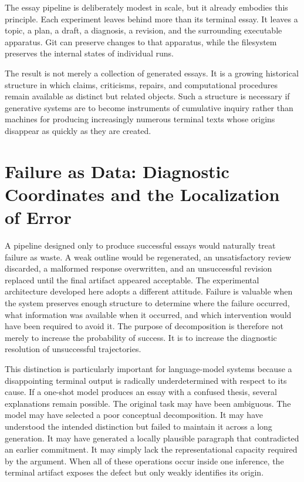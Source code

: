 \documentclass[11pt]{article}
\begin{document}
The essay pipeline is deliberately modest in scale, but it already embodies this principle. Each experiment leaves behind more than its terminal essay. It leaves a topic, a plan, a draft, a diagnosis, a revision, and the surrounding executable apparatus. Git can preserve changes to that apparatus, while the filesystem preserves the internal states of individual runs.

The result is not merely a collection of generated essays. It is a growing historical structure in which claims, criticisms, repairs, and computational procedures remain available as distinct but related objects. Such a structure is necessary if generative systems are to become instruments of cumulative inquiry rather than machines for producing increasingly numerous terminal texts whose origins disappear as quickly as they are created.

\section{Failure as Data: Diagnostic Coordinates and the Localization of Error}

A pipeline designed only to produce successful essays would naturally treat failure as waste. A weak outline would be regenerated, an unsatisfactory review discarded, a malformed response overwritten, and an unsuccessful revision replaced until the final artifact appeared acceptable. The experimental architecture developed here adopts a different attitude. Failure is valuable when the system preserves enough structure to determine where the failure occurred, what information was available when it occurred, and which intervention would have been required to avoid it. The purpose of decomposition is therefore not merely to increase the probability of success. It is to increase the diagnostic resolution of unsuccessful trajectories.

This distinction is particularly important for language-model systems because a disappointing terminal output is radically underdetermined with respect to its cause. If a one-shot model produces an essay with a confused thesis, several explanations remain possible. The original task may have been ambiguous. The model may have selected a poor conceptual decomposition. It may have understood the intended distinction but failed to maintain it across a long generation. It may have generated a locally plausible paragraph that contradicted an earlier commitment. It may simply lack the representational capacity required by the argument. When all of these operations occur inside one inference, the terminal artifact exposes the defect but only weakly identifies its origin.
\end{document}
